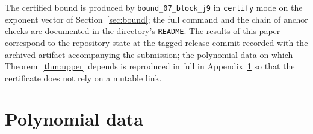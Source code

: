 \documentclass[11pt,reqno]{amsart}
\theoremstyle{plain}
\theoremstyle{definition}
\theoremstyle{remark}
\begin{document}
The certified bound is produced by \texttt{bound\_07\_block\_j9} in \texttt{certify}
mode on the exponent vector of Section~\ref{sec:bound}; the full command and the
chain of anchor checks are documented in the directory's \texttt{README}. The
results of this paper correspond to the repository state at the tagged release commit
recorded with the archived artifact accompanying the submission; the
polynomial data on which Theorem~\ref{thm:upper} depends is reproduced in full in
Appendix~\ref{app:data} so that the certificate does not rely on a mutable link.

\appendix
\section{Polynomial data}\label{app:data}
\end{document}
